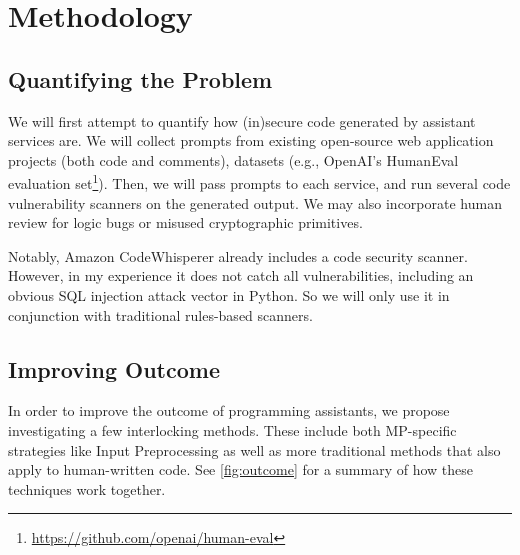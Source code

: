 \documentclass[10pt,sigplan,screen,nonacm]{acmart}
\begin{document}
\section{Methodology}

\subsection{Quantifying the Problem}
We will first attempt to quantify how (in)secure code generated by assistant services are. We will collect prompts from existing open-source web application projects (both code and comments), datasets (e.g., Open\-AI's Human\-Eval evaluation set\footnote{\url{https://github.com/openai/human-eval}}). Then, we will pass prompts to each service, and run several code vulnerability scanners on the generated output. We may also incorporate human review for logic bugs or misused cryptographic primitives.

Notably, Amazon Code\-Whis\-per\-er already includes a code security scanner. However, in my experience it does not catch all vulnerabilities, including an obvious SQL injection attack vector in Python. So we will only use it in conjunction with traditional rules-based scanners.


\subsection{Improving Outcome}

In order to improve the outcome of programming assistants, we propose investigating a few interlocking methods. These include both MP-specific strategies like Input Preprocessing as well as more traditional methods that also apply to human-written code. See \autoref{fig:outcome} for a summary of how these techniques work together.
\end{document}
